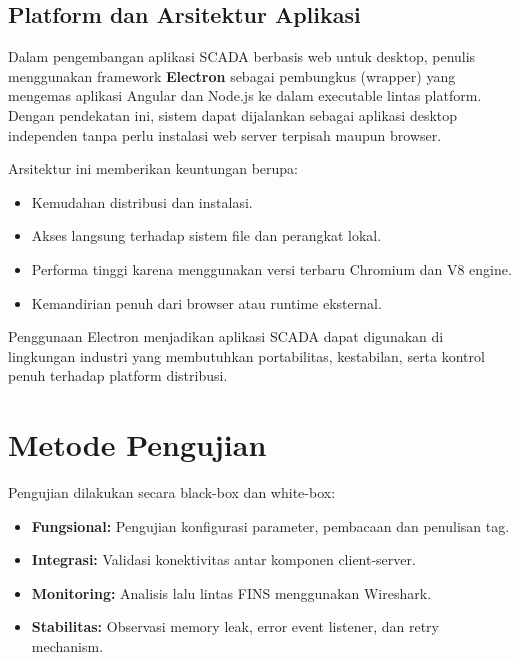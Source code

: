 \subsection{Platform dan Arsitektur Aplikasi}
Dalam pengembangan aplikasi SCADA berbasis web untuk desktop, penulis menggunakan framework \textbf{Electron} sebagai pembungkus (wrapper) yang mengemas aplikasi Angular dan Node.js ke dalam executable lintas platform. Dengan pendekatan ini, sistem dapat dijalankan sebagai aplikasi desktop independen tanpa perlu instalasi web server terpisah maupun browser.

Arsitektur ini memberikan keuntungan berupa:
\begin{itemize}
\item Kemudahan distribusi dan instalasi.
\item Akses langsung terhadap sistem file dan perangkat lokal.
\item Performa tinggi karena menggunakan versi terbaru Chromium dan V8 engine.
\item Kemandirian penuh dari browser atau runtime eksternal.
\end{itemize}

Penggunaan Electron menjadikan aplikasi SCADA dapat digunakan di lingkungan industri yang membutuhkan portabilitas, kestabilan, serta kontrol penuh terhadap platform distribusi.
\section{Metode Pengujian}
Pengujian dilakukan secara black-box dan white-box:

\begin{itemize}
    \item \textbf{Fungsional:} Pengujian konfigurasi parameter, pembacaan dan penulisan tag.
    \item \textbf{Integrasi:} Validasi konektivitas antar komponen client-server.
    \item \textbf{Monitoring:} Analisis lalu lintas FINS menggunakan Wireshark.
    \item \textbf{Stabilitas:} Observasi memory leak, error event listener, dan retry mechanism.
\end{itemize}
